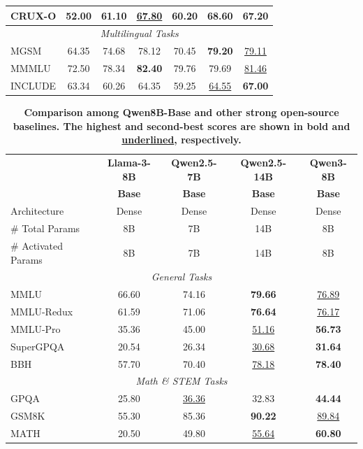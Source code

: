 \begin{table}[tbp]
{\begin{tabular}{@{}lcccccc@{}}
CRUX-O & 52.00 & 61.10 & \underline{67.80} & 60.20 & \textbf{68.60} & 67.20 \\
\midrule
\multicolumn{7}{c}{\textit{Multilingual Tasks}} \\
\midrule
MGSM & 64.35 & 74.68 & 78.12 & 70.45 & \textbf{79.20} & \underline{79.11} \\
MMMLU & 72.50 & 78.34 & \textbf{82.40} & 79.76 & 79.69 & \underline{81.46} \\
INCLUDE & 63.34 & 60.26 & 64.35 & 59.25 & \underline{64.55} & \textbf{67.00} \\
\bottomrule
\end{tabular}
}
\end{table}

\begin{table}[tbp]
\centering
\caption{\textbf{Comparison among Qwen8B-Base and other strong open-source baselines. The highest and second-best scores are shown in \textbf{bold} and \underline{underlined}, respectively.}}
\label{tab:base-8B}
\small
\begin{tabular}{@{}lcccc@{}}
\toprule
 & \textbf{Llama-3-8B} & \textbf{Qwen2.5-7B} & \textbf{Qwen2.5-14B}  & \textbf{Qwen3-8B} \\
&   \textbf{Base} & \textbf{Base} & \textbf{Base} & \textbf{Base} \\
\midrule
Architecture & Dense & Dense & Dense & Dense\\
\# Total Params & 8B & 7B & 14B & 8B \\
\# Activated Params & 8B & 7B & 14B & 8B \\
\midrule
\multicolumn{5}{c}{\textit{General Tasks}} \\
\midrule
MMLU & 66.60 & 74.16 & \textbf{79.66} & \underline{76.89}  \\
MMLU-Redux & 61.59 & 71.06 & \textbf{76.64} & \underline{76.17}  \\
MMLU-Pro & 35.36 & 45.00 &  \underline{51.16} & \textbf{56.73}  \\
SuperGPQA & 20.54 & 26.34 & \underline{30.68} & \textbf{31.64}  \\
BBH & 57.70 & 70.40 & \underline{78.18} & \textbf{78.40} \\
\midrule
\multicolumn{5}{c}{\textit{Math \& STEM Tasks}} \\
\midrule
GPQA & 25.80 & \underline{36.36} & 32.83 & \textbf{44.44} \\
GSM8K & 55.30 & 85.36 & \textbf{90.22} & \underline{89.84} \\
MATH & 20.50 & 49.80 & \underline{55.64} & \textbf{60.80}  \\

\end{tabular}
\end{table}
